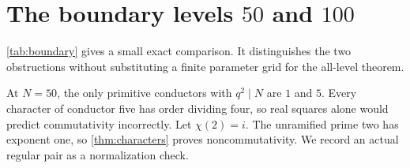 \section{The boundary levels \(50\) and \(100\)}\label{sec:examples}

\cref{tab:boundary} gives a small exact comparison.
It distinguishes the two obstructions without substituting a
finite parameter grid for the all-level theorem.
\BoundaryTable

At \(N=50\), the only primitive conductors with \(q^2\mid N\)
are \(1\) and \(5\). Every character of conductor five has
order dividing four, so real squares alone would predict
commutativity incorrectly. Let \(\chi(2)=i\).
The unramified prime two has exponent one, so
\cref{thm:characters} proves noncommutativity. We record an
actual regular pair as a normalization check.

